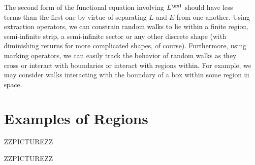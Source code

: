 The second form of the functional equation involving $L^{\um 1}$ should have less terms than the first one by virtue of separating $L$ and $E$ from one another. Using extraction operators, we can constrain random walks to lie within a finite region, semi-infinite strip, a semi-infinite sector or any other discrete shape (with diminishing returns for more complicated shapes, of course). Furthermore, using marking operators, we can easily track the behavior of random walks as they cross or interact with boundaries or interact with regions within. For example, we may consider walks interacting with the boundary of a box within some region in space. 

\section{Examples of Regions}

ZZPICTUREZZ

ZZPICTUREZZ

